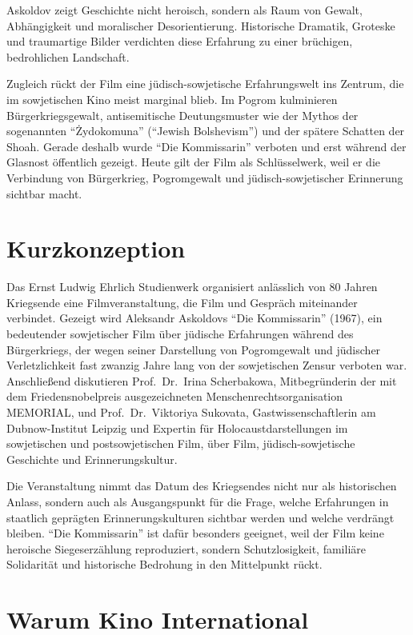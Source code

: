 \documentclass[11pt,a4paper]{article}
\begin{document}
Askoldov zeigt Geschichte nicht heroisch, sondern als Raum von Gewalt, Abh\"angigkeit und moralischer Desorientierung. Historische Dramatik, Groteske und traumartige Bilder verdichten diese Erfahrung zu einer br\"uchigen, bedrohlichen Landschaft.

Zugleich r\"uckt der Film eine j\"udisch-sowjetische Erfahrungswelt ins Zentrum, die im sowjetischen Kino meist marginal blieb. Im Pogrom kulminieren B\"urgerkriegsgewalt, antisemitische Deutungsmuster wie der Mythos der sogenannten \enquote{\.Zydokomuna} (\enquote{Jewish Bolshevism}) und der sp\"atere Schatten der Shoah. Gerade deshalb wurde \enquote{Die Kommissarin} verboten und erst w\"ahrend der Glasnost \"offentlich gezeigt. Heute gilt der Film als Schl\"usselwerk, weil er die Verbindung von B\"urgerkrieg, Pogromgewalt und j\"udisch-sowjetischer Erinnerung sichtbar macht.

\section*{Kurzkonzeption}

Das Ernst Ludwig Ehrlich Studienwerk organisiert anl\"asslich von 80 Jahren Kriegsende eine Filmveranstaltung, die Film und Gespr\"ach miteinander verbindet. Gezeigt wird Aleksandr Askoldovs \enquote{Die Kommissarin} (1967), ein bedeutender sowjetischer Film \"uber j\"udische Erfahrungen w\"ahrend des B\"urgerkriegs, der wegen seiner Darstellung von Pogromgewalt und j\"udischer Verletzlichkeit fast zwanzig Jahre lang von der sowjetischen Zensur verboten war. Anschlie{\ss}end diskutieren Prof.\ Dr.\ Irina Scherbakowa, Mitbegr\"underin der mit dem Friedensnobelpreis ausgezeichneten Menschenrechtsorganisation MEMORIAL, und Prof.\ Dr.\ Viktoriya Sukovata, Gastwissenschaftlerin am Dubnow-Institut Leipzig und Expertin f\"ur Holocaustdarstellungen im sowjetischen und postsowjetischen Film, \"uber Film, j\"udisch-sowjetische Geschichte und Erinnerungskultur.

Die Veranstaltung nimmt das Datum des Kriegsendes nicht nur als historischen Anlass, sondern auch als Ausgangspunkt f\"ur die Frage, welche Erfahrungen in staatlich gepr\"agten Erinnerungskulturen sichtbar werden und welche verdr\"angt bleiben. \enquote{Die Kommissarin} ist daf\"ur besonders geeignet, weil der Film keine heroische Siegeserz\"ahlung reproduziert, sondern Schutzlosigkeit, famili\"are Solidarit\"at und historische Bedrohung in den Mittelpunkt r\"uckt.

\section*{Warum Kino International}
\end{document}
